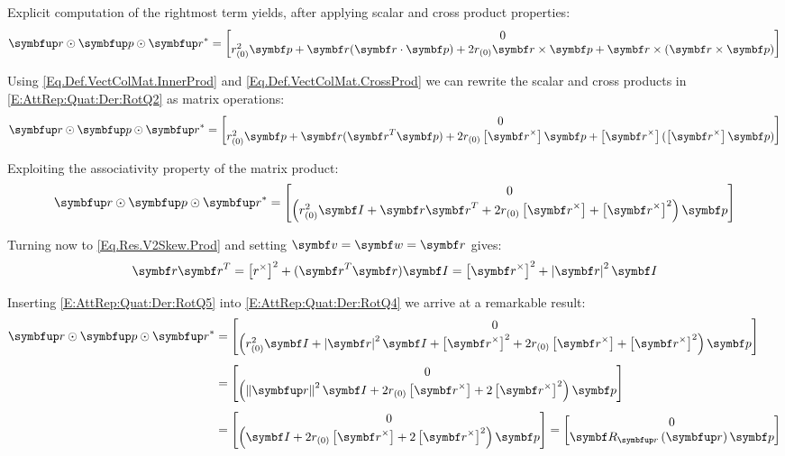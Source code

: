Explicit computation of the rightmost term yields, after applying scalar and cross product properties:
\begin{equation} \label{E:AttRep:Quat:Der:RotQ2}
\quat{\rotq} \qprod \quat{p} \qprod \qcon{\quat{\rotq}} = \qcol{0} {\qreal{\rotq}^2 \qvec{p} + \qvec{\rotq}(\qvec{\rotq}\cdot\qvec{p}) + 2 \qreal{\rotq} \qvec{\rotq} \times \qvec{p} + \qvec{\rotq} \times (\qvec{\rotq} \times \qvec{p})}
\end{equation}

Using \eqref{Eq.Def.VectColMat.InnerProd} and \eqref{Eq.Def.VectColMat.CrossProd} we can rewrite the scalar and cross products in \eqref{E:AttRep:Quat:Der:RotQ2} as matrix operations:
\begin{equation} \label{E:AttRep:Quat:Der:RotQ3}
\quat{\rotq} \qprod \quat{p} \qprod \qcon{\quat{\rotq}} = \qcol{0} {\qreal{\rotq}^2 \qvec{p} + \qvec{\rotq}(\tr{\qvec{\rotq}}\qvec{p}) + 2 \qreal{\rotq} \vskew{\qvec{\rotq}} \qvec{p} + \vskew{\qvec{\rotq}} (\vskew{\qvec{\rotq}} \qvec{p})}
\end{equation}

Exploiting the associativity property of the matrix product:
\begin{equation} \label{E:AttRep:Quat:Der:RotQ4}
\quat{\rotq} \qprod \quat{p} \qprod \qcon{\quat{\rotq}} = \qcol{0} {\left(\qreal{\rotq}^2  \IdM + \qvec{\rotq} \tr{\qvec{\rotq}} + 2 \qreal{\rotq} \vskew{\qvec{\rotq}} + \vskew{\qvec{\rotq}}^2 \right) \qvec{p}}
\end{equation}

Turning now to \eqref{Eq.Res.V2Skew.Prod} and setting $\mcol{v}=\mcol{w}=\qvec{\rotq}$ gives:
\begin{equation} \label{E:AttRep:Quat:Der:RotQ5}
\qvec{\rotq} \tr{\qvec{\rotq}} = \vskew{\rotq}^2 + (\tr{\qvec{\rotq}} \qvec{\rotq}) \IdM = \vskew{\qvec{\rotq}}^2 + \norm{\qvec{\rotq}}^2 \IdM
\end{equation}

Inserting \eqref{E:AttRep:Quat:Der:RotQ5} into \eqref{E:AttRep:Quat:Der:RotQ4} we arrive at a remarkable result:
\begin{equation} \label{E:AttRep:Quat:Der:RotQ6}
\begin{split}
\quat{\rotq} \qprod \quat{p} \qprod \qcon{\quat{\rotq}} &= \qcol{0} {\left( \qreal{\rotq}^2  \IdM + \norm{\qvec{\rotq}}^2 \IdM + \vskew{\qvec{\rotq}}^2 + 2 \qreal{\rotq} \vskew{\qvec{\rotq}} + \vskew{\qvec{\rotq}}^2 \right) \qvec{p}}\\[1ex]
&= \qcol{0} {\left( \qnorm{\quat{\rotq}}^2 \IdM + 2 \qreal{\rotq} \vskew{\qvec{\rotq}} + 2\vskew{\qvec{\rotq}}^2 \right) \qvec{p}} \\[1ex]
&= \qcol{0} {\left(\IdM + 2 \qreal{\rotq} \vskew{\qvec{\rotq}} + 2\vskew{\qvec{\rotq}}^2 \right) \qvec{p}} = \qcol{0} {\RotMQuat{\quat{\rotq}} \qvec{p}}
\end{split}
\end{equation}

